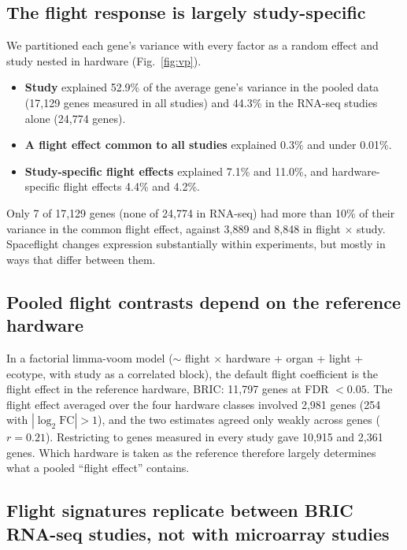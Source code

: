 \documentclass[11pt,a4paper]{article}
\begin{document}
\subsection*{The flight response is largely study-specific}

We partitioned each gene's variance with every factor as a random effect and study nested in hardware (Fig.~\ref{fig:vp}).
\begin{itemize}
    \item \textbf{Study} explained 52.9\% of the average gene's variance in the pooled data (17,129 genes measured in all studies) and 44.3\% in the RNA-seq studies alone (24,774 genes).
    \item \textbf{A flight effect common to all studies} explained 0.3\% and under 0.01\%.
    \item \textbf{Study-specific flight effects} explained 7.1\% and 11.0\%, and hardware-specific flight effects 4.4\% and 4.2\%.
\end{itemize}
Only 7 of 17,129 genes (none of 24,774 in RNA-seq) had more than 10\% of their variance in the common flight effect, against 3,889 and 8,848 in flight $\times$ study. Spaceflight changes expression substantially within experiments, but mostly in ways that differ between them.

\subsection*{Pooled flight contrasts depend on the reference hardware}

In a factorial limma-voom model ($\sim$ flight $\times$ hardware + organ + light + ecotype, with study as a correlated block), the default flight coefficient is the flight effect in the reference hardware, BRIC: 11,797 genes at FDR $< 0.05$. The flight effect averaged over the four hardware classes involved 2,981 genes (254 with $|\log_2\mathrm{FC}| > 1$), and the two estimates agreed only weakly across genes ($r = 0.21$). Restricting to genes measured in every study gave 10,915 and 2,361 genes. Which hardware is taken as the reference therefore largely determines what a pooled ``flight effect'' contains.

\subsection*{Flight signatures replicate between BRIC RNA-seq studies, not with microarray studies}
\end{document}
